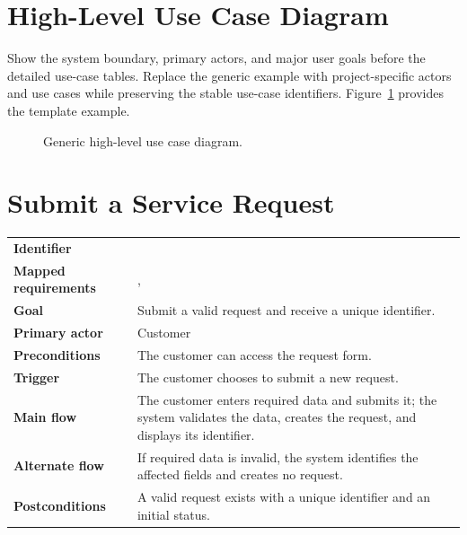 \section[High-Level Use Case Diagram]{\hspace{0.5em}High-Level Use Case Diagram}
Show the system boundary, primary actors, and major user goals before the
detailed use-case tables. Replace the generic example with project-specific
actors and use cases while preserving the stable use-case identifiers.
Figure~\ref{Figure:UseCaseDiagram} provides the template example.

\begin{figure}[htbp]
\centering

\caption{Generic high-level use case diagram.}
\label{Figure:UseCaseDiagram}
\end{figure}

\section{Submit a Service Request}
\begin{tabularx}{\linewidth}{L{3.5cm}Y}
\toprule
\textbf{Identifier} & \\
\textbf{Mapped requirements} & , \\
\textbf{Goal} & Submit a valid request and receive a unique identifier.\\
\textbf{Primary actor} & Customer\\
\textbf{Preconditions} & The customer can access the request form.\\
\textbf{Trigger} & The customer chooses to submit a new request.\\
\textbf{Main flow} & The customer enters required data and submits it; the system validates the data, creates the request, and displays its identifier.\\
\textbf{Alternate flow} & If required data is invalid, the system identifies the affected fields and creates no request.\\
\textbf{Postconditions} & A valid request exists with a unique identifier and an initial status.\\
\bottomrule
\end{tabularx}


